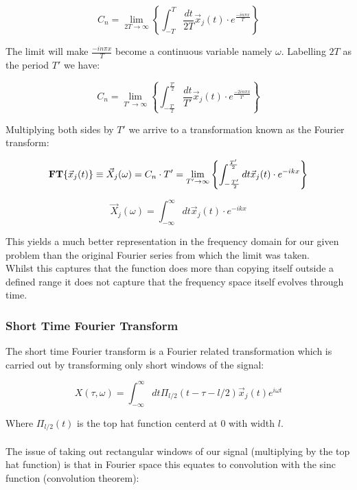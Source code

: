 \documentclass[10pt]{article}
\begin{document}
\begin{equation*}
C_{n} = \lim_{2T\to\infty} \left \{\int_{-T}^{T}\frac{dt}{2T}\vec{x}_{j}(t) \cdot e^{\frac{-in\pi x}{T}} \right \}
\end{equation*}

The limit will make $\frac{-in\pi x}{T}$  become a continuous variable namely $\omega$.  Labelling $2T$ as the period $T'$ we have:

\begin{equation*}
C_{n} = \lim_{T'\to\infty} \left \{\int_{-\frac{T'}{2}}^{\frac{T'}{2}}\frac{dt}{T'}\vec{x}_{j}(t) \cdot e^{\frac{-2in\pi x}{T'}} \right \}
\end{equation*}

Multiplying both sides by $T'$ we arrive to a transformation known as the Fourier transform:

\begin{equation*}
\bold{FT}\{\vec{x}_{j}(t) \}\equiv \vec{X}_{j}(\omega) = C_{n} \cdot T' = \lim_{T'\to\infty} \left \{\int_{-\frac{T'}{2}}^{\frac{T'}{2}}dt\vec{x}_{j}(t) \cdot e^{-ik x} \right \} 
\end{equation*}

\begin{equation*}
\vec{X}_{j}(\omega)= \int_{-\infty}^{\infty}dt\vec{x}_{j}(t) \cdot e^{-ik x} 
\end{equation*}

This yields a much better representation in the frequency domain for our given problem than the original Fourier series from which the limit was taken. \\  Whilst this captures that the function does more than copying itself outside a defined range it does not capture that the frequency space itself evolves through time.

\subsubsection{Short Time Fourier Transform}

The short time Fourier transform is a Fourier related transformation which is carried out by transforming only short windows of the signal:

\begin{equation*}
X(\tau, \omega) = \int_{-\infty}^{\infty}dt\Pi_{l/2}(t-\tau -l/2)\vec{x}_{j}(t)e^{i\omega t} 
\end{equation*}

\noindent Where $\Pi_{l/2}(t)$ is the top hat function centerd at 0 with width $l$. 
\\ \\
The issue of taking out rectangular windows of our signal (multiplying by the top hat function) is that in Fourier space this equates to convolution with the sinc function (convolution theorem):
\end{document}
